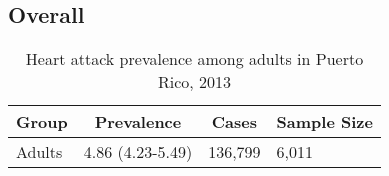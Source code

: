 

\subsection{Overall}




\begin{table}[H]
\caption{Heart attack prevalence among adults in Puerto Rico, 2013\label{tab:Overall.tabl.Heart_Attack.2013}} 
\begin{center}
\begin{tabular}{llll}
\hline\hline
\multicolumn{1}{l}{Group}&\multicolumn{1}{c}{Prevalence}&\multicolumn{1}{c}{Cases}&\multicolumn{1}{c}{Sample Size}\tabularnewline
\hline
Adults&4.86 (4.23-5.49)&136,799&6,011\tabularnewline
\hline
\end{tabular}\end{center}

\end{table}




